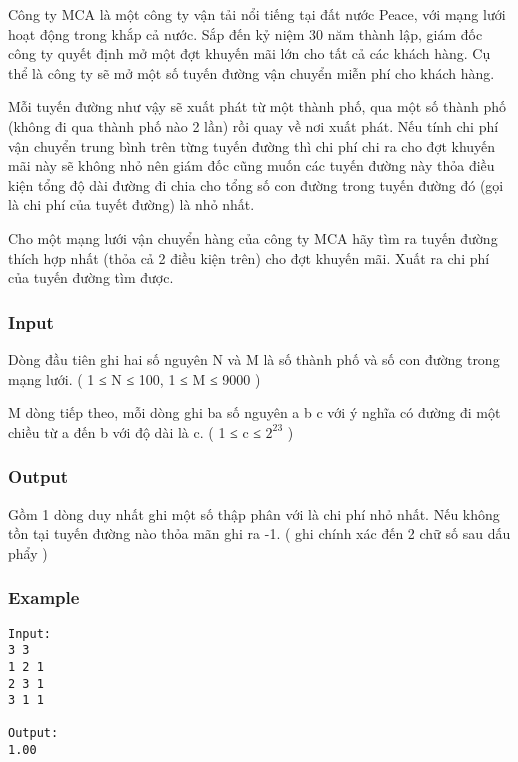 



   Công ty MCA là một công ty vận tải nổi tiếng tại đất nước Peace, với mạng lưới hoạt động trong khắp cả nước. Sắp đến kỷ niệm 30 năm thành lập, giám đốc công ty quyết định mở một đợt khuyến mãi lớn cho tất cả các khách hàng. Cụ thể là công ty sẽ mở một số tuyến đường vận chuyển miễn phí cho khách hàng.  

   Mỗi tuyến đường như vậy sẽ xuất phát từ một thành phố, qua một số thành phố (không đi qua thành phố nào 2 lần) rồi quay về nơi xuất phát. Nếu tính chi phí vận chuyển trung bình trên từng tuyến đường thì chi phí chi ra cho đợt khuyến mãi này sẽ không nhỏ nên giám đốc cũng muốn các tuyến đường này thỏa điều kiện tổng độ dài đường đi chia cho tổng số con đường trong tuyến đường đó (gọi là chi phí của tuyết đường) là nhỏ nhất.  

   Cho một mạng lưới vận chuyển hàng của công ty MCA hãy tìm ra tuyến đường thích hợp nhất (thỏa cả 2 điều kiện trên) cho đợt khuyến mãi. Xuất ra chi phí của tuyến đường tìm được.  

\subsubsection{   Input  }

   Dòng đầu tiên ghi hai số nguyên N và M là số thành phố và số con đường trong mạng lưới. ( 1 ≤ N ≤ 100,  1 ≤ M ≤ 9000 )  

   M dòng tiếp theo, mỗi dòng ghi ba số nguyên a b c với ý nghĩa có đường đi một chiều từ a đến b với độ dài là c. ( 1 ≤ c ≤ $2^{23}$   )  

\subsubsection{   Output  }

   Gồm 1 dòng duy nhất ghi một số thập phân với là chi phí nhỏ nhất. Nếu không tồn tại tuyến đường nào thỏa mãn ghi ra -1. ( ghi chính xác đến 2 chữ số sau dấu phẩy )  

\subsubsection{   Example  }
\begin{verbatim}
Input:
3 3
1 2 1
2 3 1
3 1 1

Output:
1.00

\end{verbatim}
